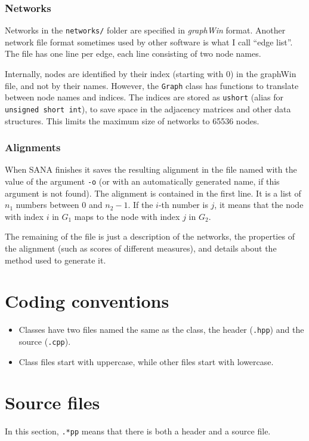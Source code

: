\documentclass[]{article}
\begin{document}
\subsubsection*{Networks}
Networks in the \texttt{networks/} folder are specified in \textit{graphWin} format. Another network file format sometimes used by other software is what I call ``edge list''. The file has one line per edge, each line consisting of two node names.

Internally, nodes are identified by their index (starting with 0) in the graphWin file, and not by their names. However, the \texttt{Graph} class has functions to translate between node names and indices. The indices are stored as \texttt{ushort} (alias for \texttt{unsigned short int}), to save space in the adjacency matrices and other data structures. This limits the maximum size of networks to 65536 nodes.


\subsubsection*{Alignments}
When SANA finishes it saves the resulting alignment in the file named with the value of the argument \texttt{-o} (or with an automatically generated name, if this argument is not found). The alignment is contained in the first line. It is a list of $n_1$ numbers between $0$ and $n_2-1$. If the $i$-th number is $j$, it means that the node with index $i$ in $G_1$ maps to the node with index $j$ in $G_2$.

The remaining of the file is just a description of the networks, the properties of the alignment (such as scores of different measures), and details about the method used to generate it.

\section{Coding conventions}

\begin{itemize}
\item Classes have two files named the same as the class, the header (\texttt{.hpp}) and the source (\texttt{.cpp}).
\item Class files start with uppercase, while other files start with lowercase.
\end{itemize}


\section{Source files}
In this section, \texttt{.*pp} means that there is both a header and a source file.
\end{document}
